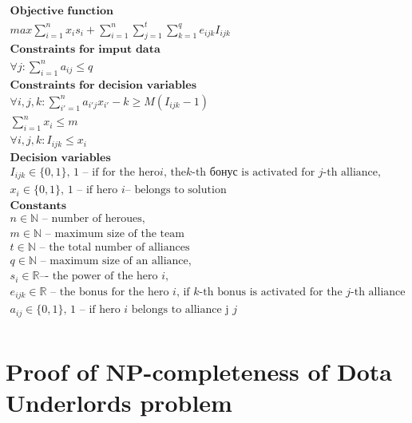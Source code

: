 \documentclass{article}
\begin{document}
\begin{equation}
\label{eq:DUIP}
\begin{gathered}
\textbf{Objective function}\\
max \sum_{i=1}^{n} x_i s_i + \sum_{i=1}^{n} \sum_{j=1}^{t}  \sum_{k=1}^{q} e_{ijk} I_{ijk} \\
\textbf{Constraints for imput data}\\
\forall{j} : \sum_{i=1}^n a_{ij} \le q \\
\textbf{Constraints for decision variables} \\
\forall{i,j,k} :  \sum_{i'=1}^{n} a_{i'j} x_{i'} - k \ge M( I_{ijk}  - 1) \\
\sum_{i=1}^n x_i \le m   \\ 
\forall{i,j,k} :  I_{ijk}  \le x_i \\
\textbf{Decision variables} \\
I_{ijk} \in \{0, 1\} \text {, 1 – if for the hero} i \text{, the} k\text{-th бонус is activated for }  j \text{-th alliance,} \\
x_i  \in \{0, 1\} \text{, 1 -- if hero } i \text{– belongs to solution} \\
\textbf{Constants} \\
n \in \mathbb{N} \text{ -- number of heroues,} \\
m \in \mathbb{N} \text{ -- maximum size of the team}\\
t \in \mathbb{N} \text{ -- the total number of alliances} \\
q \in \mathbb{N} \text{ -- maximum size of an alliance,} \\
s_i  \in \mathbb{R} \text{–- the power of the hero } i, \\
e_{ijk} \in \mathbb{R} \text{ -- the bonus for the hero } i \text{,  if } k
\text{-th bonus is activated for the } j \text{-th alliance} \\
a_{ij} \in \{0, 1\} \text{, 1 -- if hero } i \text{ belongs to alliance j } j \\ 
\end{gathered}
\end{equation}

\section{Proof of NP-completeness of Dota Underlords problem}
\label{SectionNPCompleteProof}
\end{document}
